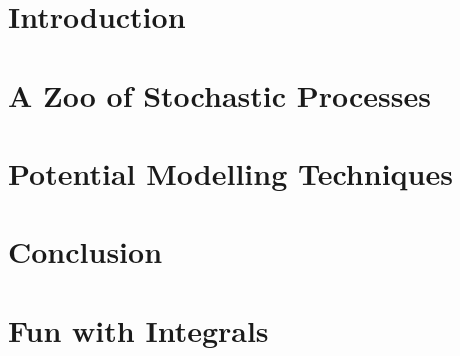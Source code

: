 \documentclass{report}
\begin{document}


\tableofcontents

\chapter{Introduction}



\chapter{A Zoo of Stochastic Processes}\label{zoo}



\chapter{Potential Modelling Techniques}\label{techniques}



\chapter{Conclusion}



\appendix
\chapter{Fun with Integrals}\label{fun}


\end{document}
